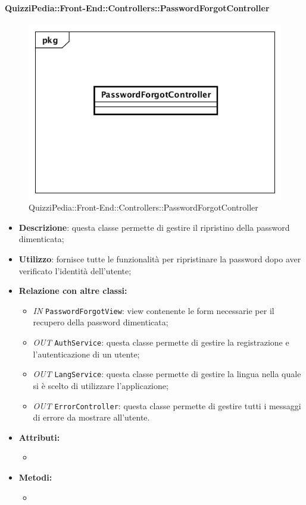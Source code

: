 \paragraph{QuizziPedia::Front-End::Controllers::PasswordForgotController}
\begin{figure}
	\centering
	\includegraphics[scale=0.45]{UML/Classi/Front-End/QuizziPedia_Front-end_Controller_PasswordForgotController.png}
	\caption{QuizziPedia::Front-End::Controllers::PasswordForgotController}
\end{figure}
\begin{itemize}
	\item \textbf{Descrizione}: questa classe permette di gestire il ripristino della password dimenticata;
	\item \textbf{Utilizzo}: fornisce tutte le funzionalità per ripristinare la password dopo aver verificato l'identità dell'utente;
	\item \textbf{Relazione con altre classi:}
	\begin{itemize}
		\item \textit{IN} \texttt{PasswordForgotView}: view contenente le form necessarie per il recupero della password dimenticata; 
		\item \textit{OUT} \texttt{AuthService}: questa classe permette di gestire la registrazione e l'autenticazione di un utente;
		\item \textit{OUT} \texttt{LangService}: questa classe permette di gestire la lingua nella quale si è scelto di utilizzare l'applicazione;
		\item \textit{OUT} \texttt{ErrorController}: questa classe permette di gestire tutti i messaggi di errore da mostrare all'utente.
	\end{itemize}
	\item \textbf{Attributi:}
	\begin{itemize}
		\item 
	\end{itemize}
	\item \textbf{Metodi:}
	\begin{itemize}
		\item 
	\end{itemize}
\end{itemize}

